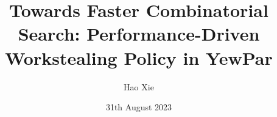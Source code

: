 \documentclass{mproj}
\begin{document}
\title{Towards Faster Combinatorial Search: Performance-Driven Workstealing Policy in YewPar}
\author{Hao Xie}
\date{31th August 2023}
\maketitle

\begin{abstract}





\end{abstract}
\end{document}
